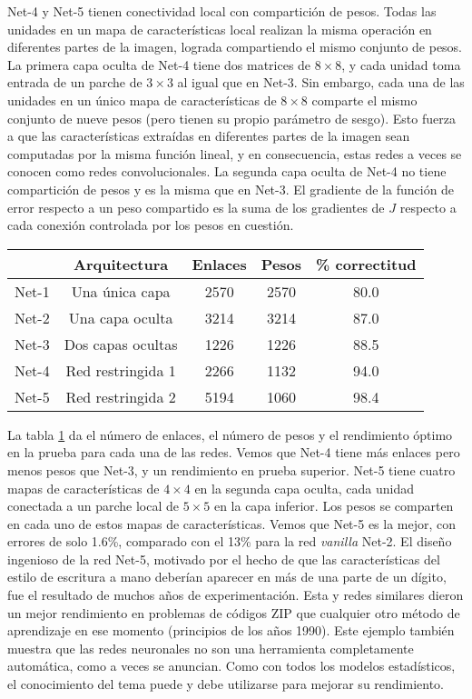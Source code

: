 Net-4 y Net-5 tienen conectividad local con compartición de pesos. Todas las unidades en un mapa de características local realizan la misma operación en diferentes partes de la imagen, lograda compartiendo el mismo conjunto de pesos. La primera capa oculta de Net-4 tiene dos matrices de $8 \times 8$, y cada unidad toma entrada de un parche de $3 \times 3$ al igual que en Net-3. Sin embargo, cada una de las unidades en un único mapa de características de $8 \times 8$ comparte el mismo conjunto de nueve pesos (pero tienen su propio parámetro de sesgo). Esto fuerza a que las características extraídas en diferentes partes de la imagen sean computadas por la misma función lineal, y en consecuencia, estas redes a veces se conocen como redes convolucionales. La segunda capa oculta de Net-4 no tiene compartición de pesos y es la misma que en Net-3. El gradiente de la función de error respecto a un peso compartido es la suma de los gradientes de $J$ respecto a cada conexión controlada por los pesos en cuestión. \\

\begin{table}[h]
\centering
\begin{tabular}{ccccc}
\hline \hline 
 & Arquitectura & Enlaces & Pesos & \% correctitud \\ \hline \hline 
Net-1 & Una única capa & 2570 & 2570 & 80.0 \\
Net-2 & Una capa oculta & 3214 & 3214 & 87.0 \\
Net-3 & Dos capas ocultas & 1226 & 1226 & 88.5 \\
Net-4 & Red restringida 1 & 2266 & 1132 & 94.0 \\
Net-5 & Red restringida 2 & 5194 & 1060 & 98.4 \\ \hline
\end{tabular}
\label{tab:7.1}
\end{table}

La tabla \ref{tab:7.1} da el número de enlaces, el número de pesos y el rendimiento óptimo en la prueba para cada una de las redes. Vemos que Net-4 tiene más enlaces pero menos pesos que Net-3, y un rendimiento en prueba superior. Net-5 tiene cuatro mapas de características de $4 \times 4$ en la segunda capa oculta, cada unidad conectada a un parche local de $5 \times 5$ en la capa inferior. Los pesos se comparten en cada uno de estos mapas de características. Vemos que Net-5 es la mejor, con errores de solo 1.6\%, comparado con el 13\% para la red \textit{vanilla} Net-2. El diseño ingenioso de la red Net-5, motivado por el hecho de que las características del estilo de escritura a mano deberían aparecer en más de una parte de un dígito, fue el resultado de muchos años de experimentación. Esta y redes similares dieron un mejor rendimiento en problemas de códigos ZIP que cualquier otro método de aprendizaje en ese momento (principios de los años 1990). Este ejemplo también muestra que las redes neuronales no son una herramienta completamente automática, como a veces se anuncian. Como con todos los modelos estadísticos, el conocimiento del tema puede y debe utilizarse para mejorar su rendimiento. \\

